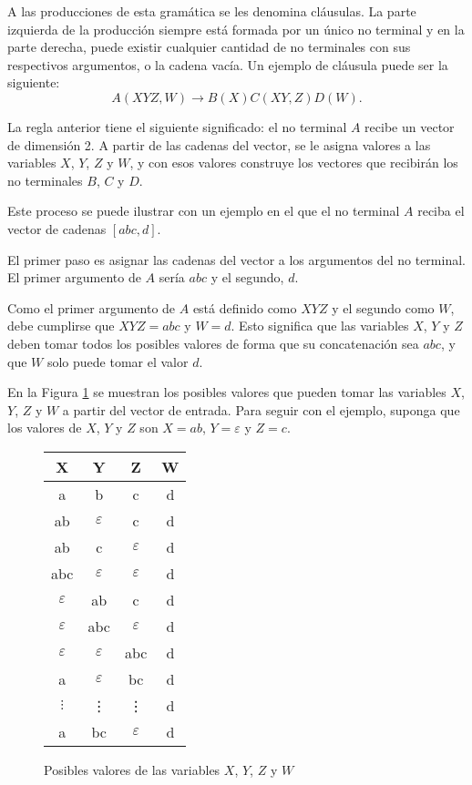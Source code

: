 A las producciones de esta gramática se les denomina cláusulas. La parte izquierda de la producción 
siempre está formada por un único no terminal y en la parte derecha, puede existir cualquier cantidad de no terminales 
con sus respectivos argumentos, o la cadena vacía. Un ejemplo de cláusula puede ser la siguiente:
$$A(XYZ,W)\to B(X)C(XY,Z)D(W).$$

La regla anterior tiene el siguiente significado: el no terminal $A$ recibe un vector de dimensión 2. A partir 
de las cadenas del vector, se le asigna valores a las variables $X$, $Y$, $Z$ y $W$, y con esos valores 
construye los vectores que recibirán los no terminales $B$, $C$ y $D$.

Este proceso se puede ilustrar con un ejemplo en el que el no terminal $A$ reciba el vector de cadenas $[abc, d]$.

El primer paso es asignar las cadenas del vector a los argumentos del no terminal. El primer argumento de $A$ sería $abc$ y el segundo, $d$.

Como el primer argumento de $A$ está definido como $XYZ$ y el segundo como $W$, debe cumplirse que $XYZ=abc$ y $W=d$. Esto significa que las variables $X$, $Y$ y $Z$ deben tomar todos los posibles valores de forma que su concatenación sea $abc$, y que $W$ solo puede tomar el valor $d$.

En la Figura \ref{fig:xyz_eaxmple} se muestran los posibles valores que pueden tomar las variables $X$, $Y$, $Z$ y $W$ a partir del vector de entrada. Para seguir con el ejemplo, suponga que los valores de $X$, $Y$ y $Z$ son $X=ab$, $Y=\varepsilon$ y $Z=c$.


\begin{figure}
    \centering
    \begin{tabular}{|c|c|c|c|}
        \hline
        X             & Y             & Z             & W \\
        \hline
        a             & b             & c             & d \\
        \hline
        ab            & $\varepsilon$ & c             & d \\
        \hline
        ab            & c             & $\varepsilon$ & d \\
        \hline
        abc           & $\varepsilon$ & $\varepsilon$ & d \\
        \hline
        $\varepsilon$ & ab            & c             & d \\
        \hline
        $\varepsilon$ & abc           & $\varepsilon$ & d \\
        \hline
        $\varepsilon$ & $\varepsilon$ & abc           & d \\
        \hline
        a             & $\varepsilon$ & bc            & d \\
        \hline
        $\vdots$      & \vdots        & \vdots        & d \\
        \hline
        a             & bc            & $\varepsilon$ & d \\
        \hline
    \end{tabular}
    \caption{Posibles valores de las variables $X$, $Y$, $Z$ y $W$}
    \label{fig:xyz_eaxmple}
\end{figure}

